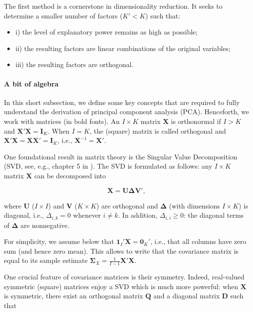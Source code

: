 The first method is a cornerstone in dimensionality reduction. It seeks to determine a smaller number of factors ($K'<K$) such that:

\begin{itemize}
\item i) the level of explanatory power remains as high as possible;
\item ii) the resulting factors are linear combinations of the original variables;
\item iii) the resulting factors are orthogonal.
\end{itemize}

\paragraph{A bit of algebra}

In this short subsection, we define some key concepts that are required to fully understand the derivation of principal component analysis (PCA). Henceforth, we work with matrices (in bold fonts). An $I \times K$ matrix $\textbf{X}$ is orthonormal if $I> K$ and $\textbf{X}'\textbf{X}=\textbf{I}_K$. When $I=K$, the (square) matrix is called orthogonal and $\textbf{X}'\textbf{X}=\textbf{X}\textbf{X}'=\textbf{I}_K$, i.e., $\textbf{X}^{ -1}=\textbf{X}'$.

One foundational result in matrix theory is the Singular Value Decomposition (SVD, see, e.g., chapter 5 in \cite{meyer2000matrix}). The SVD is formulated as follows: any $I \times K$ matrix $\textbf{X}$ can be decomposed into

\begin{equation}
\label{eq:svd}
\textbf{X}=\textbf{U} \boldsymbol{\Delta} \textbf{V}',
\end{equation}

where $\textbf{U}$ ($I\times I$) and $\textbf{V}$ ($K \times K$) are orthogonal and $\boldsymbol{\Delta}$ (with dimensions $I\times K$) is diagonal, i.e., $\Delta_{i,k}=0$ whenever $i\neq k$. In addition, $\Delta_{i,i}\ge 0$: the diagonal terms of $\boldsymbol{\Delta}$ are nonnegative.

For simplicity, we assume below that $\textbf{1}_I'\textbf{X}=\textbf{0}_K'$, i.e., that all columns have zero sum (and hence zero mean). This allows to write that the covariance matrix is equal to its sample estimate $\boldsymbol{\Sigma}_X= \frac{1}{I -1}\textbf{X}'\textbf{X}$.

One crucial feature of covariance matrices is their symmetry. Indeed, real-valued symmetric (square) matrices enjoy a SVD which is much more powerful: when $\textbf{X}$ is symmetric, there exist an orthogonal matrix $\textbf{Q}$ and a diagonal matrix $\textbf{D}$ such that

